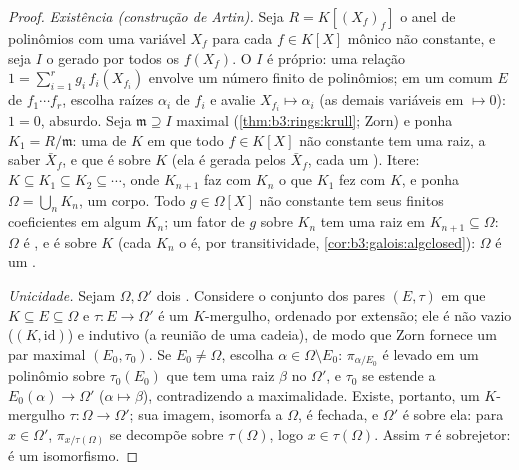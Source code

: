 \begin{proof}
\emph{Existência (construção de Artin).} Seja $R = K[(X_f)_f]$ o anel de
polinômios com uma variável $X_f$ para cada $f \in K[X]$ mônico não
constante, e seja $I$ o  gerado por todos os $f(X_f)$. O
 $I$ é próprio: uma relação $1 = \sum_{i=1}^r g_i\,
f_i(X_{f_i})$ envolve um número finito de
polinômios; em um  comum $E$ de $f_1\cdots f_r$, escolha
raízes $\alpha_i$ de $f_i$ e avalie $X_{f_i} \mapsto \alpha_i$ (as demais variáveis em
$\mapsto 0$): $1 = 0$, absurdo. Seja $\mathfrak m \supseteq I$ maximal (\cref{thm:b3:rings:krull}; Zorn)
e ponha $K_1 = R/\mathfrak
m$: uma  de $K$ em que todo $f \in
K[X]$ não
constante tem uma raiz, a saber $\bar X_f$, e que é  sobre $K$
(ela é gerada pelos $\bar X_f$, cada um ). Itere: $K \subseteq K_1 \subseteq K_2 \subseteq \cdots$, onde $K_{n+1}$
faz com $K_n$ o que $K_1$ fez com $K$, e ponha $\Omega =
\bigcup_n K_n$, um
corpo. Todo $g \in \Omega[X]$ não constante tem seus finitos coeficientes em algum
$K_n$; um fator  de $g$ sobre $K_n$ tem uma raiz
em $K_{n+1} \subseteq
\Omega$: $\Omega$ é , e é  sobre
$K$ (cada $K_n$ o é, por transitividade, \cref{cor:b3:galois:algclosed}):
$\Omega$ é um .

\emph{Unicidade.} Sejam $\Omega, \Omega'$ dois . Considere o
conjunto dos pares $(E, \tau)$ em que $K
\subseteq E \subseteq \Omega$ e $\tau\colon E \to \Omega'$ é um $K$-mergulho,
ordenado por extensão; ele é não vazio ($(K,
\mathrm{id})$) e indutivo (a reunião de
uma cadeia), de modo que Zorn fornece um par maximal $(E_0, \tau_0)$. Se $E_0 \neq \Omega$,
escolha $\alpha \in
\Omega\setminus E_0$: $\pi_{\alpha/E_0}$ é levado em um polinômio sobre $\tau_0(E_0)$ que tem uma
raiz $\beta$ no  $\Omega'$, e $\tau_0$
se estende a $E_0(\alpha) \to
\Omega'$ ($\alpha \mapsto \beta$), contradizendo a maximalidade. Existe,
portanto, um $K$-mergulho $\tau \colon \Omega \to \Omega'$; sua imagem, isomorfa a
$\Omega$, é  fechada, e $\Omega'$ é  sobre ela:
para $x \in \Omega'$, $\pi_{x/\tau(\Omega)}$ se decompõe sobre $\tau(\Omega)$, logo $x \in
\tau(\Omega)$. Assim
$\tau$ é sobrejetor: é um isomorfismo.
\end{proof}

